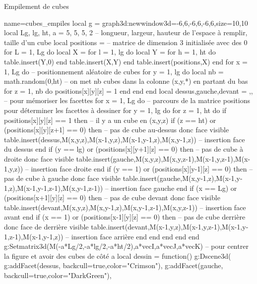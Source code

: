 \begin{demo}{Empilement de cubes}
\begin{luadraw}{name=cubes_empiles}
local g = graph3d:new{window3d={-6,6,-6,6,-6,6},size={10,10}}
local Lg, lg, ht, a = 5, 5, 5, 2 -- longueur, largeur, hauteur de l'espace à remplir, taille d'un cube
local positions = {} -- matrice de dimension 3 initialisée avec des 0
for L = 1, Lg do
    local X = {}
    for l = 1, lg do
        local Y = {}
        for h = 1, ht do table.insert(Y,0) end
        table.insert(X,Y)
    end
    table.insert(positions,X)
end
for x = 1, Lg do  -- positionnement aléatoire de cubes
    for y = 1, lg do
        local nb = math.random(0,ht) -- on met nb cubes dans la colonne (x,y,*) en partant du bas
        for z = 1, nb do positions[x][y][z] = 1 end
    end
end
local dessus,gauche,devant = {},{},{} -- pour mémoriser les facettes
for x = 1, Lg do -- parcours de la matrice positions pour déterminer les facettes à dessiner
    for y = 1, lg do
        for z = 1, ht do
            if positions[x][y][z] == 1 then -- il y a un cube en (x,y,z)
                if (z == ht) or (positions[x][y][z+1] == 0) then -- pas de cube au-dessus donc face visible
                    table.insert(dessus,{M(x,y,z),M(x-1,y,z),M(x-1,y-1,z),M(x,y-1,z)}) -- insertion face du dessus
                end
                if (y == lg) or (positions[x][y+1][z] == 0) then -- pas de cube à droite donc face  visible
                    table.insert(gauche,{M(x,y,z),M(x,y,z-1),M(x-1,y,z-1),M(x-1,y,z)}) -- insertion face droite
                end
                if (y == 1) or (positions[x][y-1][z] == 0) then -- pas de cube à gauche donc face visible
                    table.insert(gauche,{M(x,y-1,z),M(x-1,y-1,z),M(x-1,y-1,z-1),M(x,y-1,z-1)}) -- insertion face gauche
                end                    
                if (x == Lg) or (positions[x+1][y][z] == 0) then -- pas de cube devant donc face visible
                    table.insert(devant,{M(x,y,z),M(x,y-1,z),M(x,y-1,z-1),M(x,y,z-1)}) -- insertion face avant
                end
                if (x == 1) or (positions[x-1][y][z] == 0) then -- pas de cube derrière donc face de derrière visible
                    table.insert(devant,{M(x-1,y,z),M(x-1,y,z-1),M(x-1,y-1,z-1),M(x-1,y-1,z)}) -- insertion face arrière
                end
            end
        end
    end
end
g:Setmatrix3d({M(-a*Lg/2,-a*lg/2,-a*ht/2),a*vecI,a*vecJ,a*vecK}) -- pour centrer la figure et avoir des cubes de côté a
local dessin = function()
    g:Dscene3d(
        g:addFacet(dessus, {backcull=true,color="Crimson"}), g:addFacet(gauche, {backcull=true,color="DarkGreen"}),

\end{luadraw}
\end{demo}
